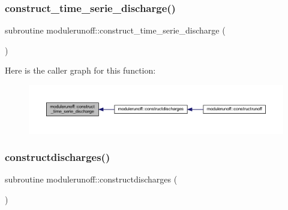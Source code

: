 \subsubsection{\texorpdfstring{construct\+\_\+time\+\_\+serie\+\_\+discharge()}{construct\_time\_serie\_discharge()}}
{\footnotesize\ttfamily subroutine modulerunoff\+::construct\+\_\+time\+\_\+serie\+\_\+discharge (\begin{DoxyParamCaption}{ }\end{DoxyParamCaption})\hspace{0.3cm}{\ttfamily [private]}}

Here is the caller graph for this function\+:\nopagebreak
\begin{figure}[H]
\begin{center}
\leavevmode
\includegraphics[width=350pt]{namespacemodulerunoff_a7d3fe3f8c8fecb1a73f35d1963f7b2b5_icgraph}
\end{center}
\end{figure}
\mbox{\label{namespacemodulerunoff_aaa760a0a33dfff4681a831fe25d1b075}} 
\subsubsection{\texorpdfstring{constructdischarges()}{constructdischarges()}}
{\footnotesize\ttfamily subroutine modulerunoff\+::constructdischarges (\begin{DoxyParamCaption}{ }\end{DoxyParamCaption})\hspace{0.3cm}{\ttfamily [private]}}

